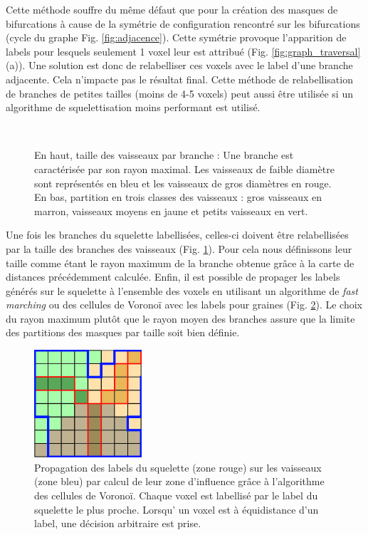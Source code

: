 Cette méthode souffre du même défaut que pour la création des masques de bifurcations à cause de la symétrie de configuration rencontré sur les bifurcations (cycle du graphe Fig. \ref{fig:adjacence}). Cette symétrie provoque l'apparition de labels pour lesquels seulement 1 voxel leur est attribué (Fig. \ref{fig:graph_traversal} (a)). Une solution est donc de relabelliser ces voxels avec le label d'une branche adjacente. Cela n'impacte pas le résultat final. Cette méthode de relabellisation de branches de petites tailles (moins de 4-5 voxels) peut aussi être utilisée si un algorithme de squelettisation moins performant est utilisé.
\begin{figure}[!ht]
  \centering
  \\
  \caption{En haut, taille des vaisseaux par branche : Une branche est caractérisée par son rayon maximal. Les vaisseaux de faible diamètre sont représentés en bleu et les vaisseaux de gros diamètres en rouge. En bas, partition en trois classes des vaisseaux : gros vaisseaux en marron, vaisseaux moyens en jaune et petits vaisseaux en vert.}
  \label{fig:vessels_partition}
\end{figure}
Une fois les branches du squelette labellisées, celles-ci doivent être relabellisées par la taille des branches des vaisseaux (Fig. \ref{fig:vessels_partition}). Pour cela nous définissons leur taille comme étant le rayon maximum de la branche obtenue grâce à la carte de distances précédemment calculée. Enfin, il est possible de propager les labels générés sur le squelette à l'ensemble des voxels en utilisant un algorithme de \textit{fast marching} ou des cellules de Voronoï avec les labels pour graines (Fig. \ref{fig:voronoi}). Le choix du rayon maximum plutôt que le rayon moyen des branches assure que la limite des partitions des masques par taille soit bien définie.
\begin{figure}[!ht]
  \centering
  \includegraphics[height=4cm]{Images/voronoi.png}
  \caption{Propagation des labels du squelette (zone rouge) sur les vaisseaux (zone bleu) par calcul de leur zone d'influence grâce à l'algorithme des cellules de Voronoï. Chaque voxel est labellisé par le label du squelette le plus proche. Lorsqu' un voxel est à équidistance d'un label, une décision arbitraire est prise.}
  \label{fig:voronoi}
\end{figure}
